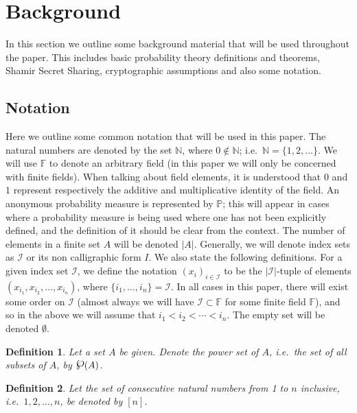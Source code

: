 \documentclass{article}
\newcommand\paper{paper}
\newcommand{\powerset}{\raisebox{.15\baselineskip}{\Large\ensuremath{\wp}}}
\newcommand{\seq}[1]{\left[#1\right]}
\newtheorem{definition}{Definition}
\theoremstyle{remark}
\newcommand{\N}{\mathbb{N}}
\newcommand{\F}{\mathbb{F}}
\renewcommand{\P}{\mathbb{P}}
\begin{document}
\section{Background}

In this section we outline some background material that will be used
throughout the \paper{}. This includes basic probability theory definitions and
theorems, Shamir Secret Sharing, cryptographic assumptions and also some
notation.

\subsection{Notation}

Here we outline some common notation that will be used in this \paper{}. The
natural numbers are denoted by the set $\N$, where $0 \notin \N$; i.e.\ $\N =
\{1, 2, \ldots\}$. We will use $\F$ to denote an arbitrary field (in this
\paper{} we will only be concerned with finite fields). When talking about
field elements, it is understood that $0$ and $1$ represent respectively the
additive and multiplicative identity of the field. An anonymous probability
measure is represented by $\P$; this will appear in cases where a probability
measure is being used where one has not been explicitly defined, and the
definition of it should be clear from the context. The number of elements in a
finite set $A$ will be denoted $|A|$. Generally, we will denote index sets as
$\mathcal{I}$ or its non calligraphic form $I$. We also state the following
definitions. For a given index set $\mathcal{I}$, we define the notation
${(x_i)}_{i \in \mathcal{I}}$ to be the $|\mathcal{I}|$-tuple of elements
$(x_{i_1}, x_{i_2}, \ldots, x_{i_n})$, where $\{i_1, \ldots, i_n\} =
\mathcal{I}$. In all cases in this \paper{}, there will exist some order on
$\mathcal{I}$ (almost always we will have $\mathcal{I} \subset \F$ for some
finite field $\F$), and so in the above we will assume that $i_1 < i_2 < \cdots
< i_n$. The empty set will be denoted $\emptyset$.

\begin{definition}
	Let a set $A$ be given. Denote the \textit{power set} of $A$, i.e.\ the set
	of all subsets of $A$, by $\powerset(A)$.
\end{definition}

\begin{definition}
	Let the set of consecutive natural numbers from 1 to $n$ inclusive, i.e.\
	$1, 2, \ldots, n$, be denoted by $\seq{n}$.
\end{definition}
\end{document}
